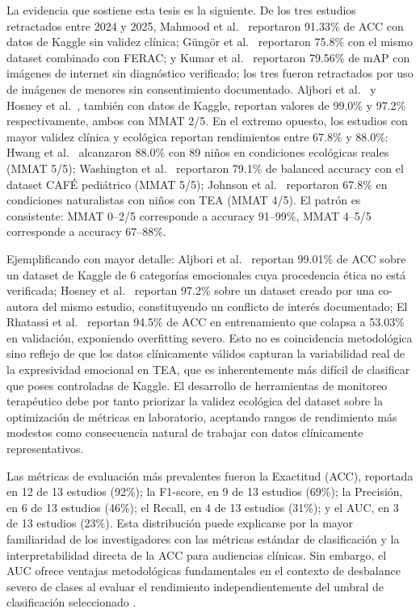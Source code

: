 \documentclass[3p,twocolumn,times]{elsarticle}
\begin{document}
	La evidencia que sostiene esta tesis es la siguiente. De los tres estudios
	retractados entre 2024 y 2025, Mahmood et al.\ \cite{Mahmood2025} reportaron
	91.33\% de ACC con datos de Kaggle sin validez clínica; Güngör et al.\
	\cite{Gungor2025} reportaron 75.8\% con el mismo dataset combinado con FERAC; y
	Kumar et al.\ \cite{Kumar2024} reportaron 79.56\% de mAP con imágenes de internet
	sin diagnóstico verificado; los tres fueron retractados por uso de imágenes de
	menores sin consentimiento documentado. Aljbori et al.\ \cite{Aljbori2025} y
	Hosney et al.\ \cite{Hosney2024}, también con datos de Kaggle, reportan valores de
	99.0\% y 97.2\% respectivamente, ambos con MMAT 2/5. En el extremo opuesto, los
	estudios con mayor validez clínica y ecológica reportan rendimientos entre 67.8\%
	y 88.0\%: Hwang et al.\ \cite{Hwang2024} alcanzaron 88.0\% con 89 niños en
	condiciones ecológicas reales (MMAT 5/5); Washington et al.\ \cite{Washington2022}
	reportaron 79.1\% de balanced accuracy con el dataset CAFÉ pediátrico (MMAT 5/5);
	Johnson et al.\ \cite{Johnson2025} reportaron 67.8\% en condiciones naturalistas
	con niños con TEA (MMAT 4/5). El patrón es consistente: MMAT 0--2/5 corresponde a
	accuracy 91--99\%, MMAT 4--5/5 corresponde a accuracy 67--88\%.
	
	Ejemplificando con mayor detalle: Aljbori et al.\ \cite{Aljbori2025} reportan
	99.01\% de ACC sobre un dataset de Kaggle de 6 categorías emocionales cuya
	procedencia ética no está verificada; Hosney et al.\ \cite{Hosney2024} reportan
	97.2\% sobre un dataset creado por una co-autora del mismo estudio, constituyendo
	un conflicto de interés documentado; El Rhatassi et al.\ \cite{Rhatassi2025}
	reportan 94.5\% de ACC en entrenamiento que colapsa a 53.03\% en validación,
	exponiendo overfitting severo. Esto no es coincidencia metodológica sino reflejo
	de que los datos clínicamente válidos capturan la variabilidad real de la
	expresividad emocional en TEA, que es inherentemente más difícil de clasificar que
	poses controladas de Kaggle. El desarrollo de herramientas de monitoreo terapéutico
	debe por tanto priorizar la validez ecológica del dataset sobre la optimización de
	métricas en laboratorio, aceptando rangos de rendimiento más modestos como
	consecuencia natural de trabajar con datos clínicamente representativos.
	
	Las métricas de evaluación más prevalentes fueron la Exactitud (ACC), reportada en
	12 de 13 estudios (92\%); la F1-score, en 9 de 13 estudios (69\%); la Precisión,
	en 6 de 13 estudios (46\%); el Recall, en 4 de 13 estudios (31\%); y el AUC, en 3
	de 13 estudios (23\%). Esta distribución puede explicarse por la mayor familiaridad
	de los investigadores con las métricas estándar de clasificación y la
	interpretabilidad directa de la ACC para audiencias clínicas. Sin embargo, el AUC
	ofrece ventajas metodológicas fundamentales en el contexto de desbalance severo de
	clases al evaluar el rendimiento independientemente del umbral de clasificación
	seleccionado \cite{Radocaj2025,Hosney2024}.
	
\end{document}
